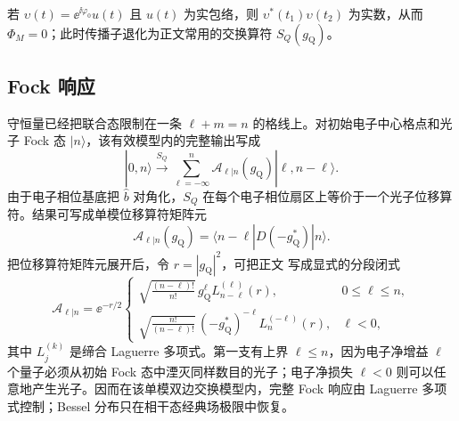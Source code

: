 若 $\upsilon(t)=\ee^{\ii\varphi_0}u(t)$ 且 $u(t)$ 为实包络，则 $\upsilon^*(t_1)\upsilon(t_2)$ 为实数，从而 $\Phi_M=0$；此时传播子退化为正文常用的交换算符 $S_Q(g_{\mathrm Q})$。

\subsection{Fock 响应}

守恒量已经把联合态限制在一条 $\ell+m=n$ 的格线上。对初始电子中心格点和光子 Fock 态 $|n\rangle$，该有效模型内的完整输出写成
\begin{equation}
\boxed{
|0,n\rangle\xrightarrow{S_Q}
\sum_{\ell=-\infty}^{n}
\mathcal A_{\ell|n}(g_{\mathrm Q})|\ell,n-\ell\rangle.}
\label{eq:qpinem_joint_fock}
\end{equation}
由于电子相位基底把 $\hat b$ 对角化，$S_Q$ 在每个电子相位扇区上等价于一个光子位移算符。结果可写成单模位移算符矩阵元
\begin{equation}
\boxed{
\mathcal A_{\ell|n}(g_{\mathrm Q})
=\langle n-\ell|D(-g_{\mathrm Q}^*)|n\rangle.}
\label{eq:A_l_n_displacement}
\end{equation}
把位移算符矩阵元展开后，令 $r=|g_{\mathrm Q}|^2$，可把正文 写成显式的分段闭式
\begin{equation}
\boxed{
\mathcal A_{\ell|n}=\ee^{-r/2}
\begin{cases}
\displaystyle
\sqrt{\frac{(n-\ell)!}{n!}}\,g_{\mathrm Q}^{\ell}
L_{n-\ell}^{(\ell)}(r), & 0\le\ell\le n,\\[8pt]
\displaystyle
\sqrt{\frac{n!}{(n-\ell)!}}\,(-g_{\mathrm Q}^*)^{-\ell}
L_n^{(-\ell)}(r), & \ell<0,
\end{cases}}
\label{eq:qpinem-fock-laguerre-dp68}
\end{equation}
其中 $L_j^{(k)}$ 是缔合 Laguerre 多项式。第一支有上界 $\ell\le n$，因为电子净增益 $\ell$ 个量子必须从初始 Fock 态中湮灭同样数目的光子；电子净损失 $\ell<0$ 则可以任意地产生光子。因而在该单模双边交换模型内，完整 Fock 响应由 Laguerre 多项式控制；Bessel 分布只在相干态经典场极限中恢复。

